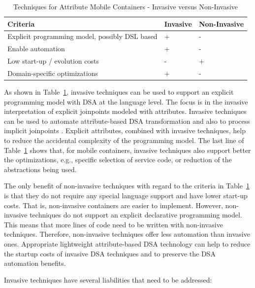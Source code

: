 \begin{table}[ht]
	\begin{center}
		\begin{tabular}[t]{|l||l|l|}
\rowcolor[gray]{.7}
\hline
Criteria & Invasive & Non-Invasive \\
\hline
Explicit programming model, possibly DSL based & + & - \\
Enable automation & + & - \\
Low start-up / evolution costs & - & + \\
Domain-specific optimizations & + & - \\
\hline
		\end{tabular}
	\end{center}

	\caption{Techniques for Attribute Mobile Containers - Invasive versus Non-Invasive}
	\label{tab:InvasiveVSNonInvasive}
\end{table}

As shown in Table~\ref{tab:InvasiveVSNonInvasive}, invasive techniques can be used to support an explicit programming model with DSA at the language level. The focus is in the invasive interpretation of explicit joinpoints modeled with attributes. Invasive techniques can be used to automate attribute-based DSA transformation and also to process implicit joinpoints . Explicit attributes, combined with invasive techniques, help to reduce the accidental complexity of the programming model. The last line of Table~\ref{tab:InvasiveVSNonInvasive} shows that, for mobile containers, invasive techniques also support better the optimizations, e.g., specific selection of service code, or reduction of the abstractions being used.

The only benefit of non-invasive techniques with regard to the criteria in Table~\ref{tab:InvasiveVSNonInvasive} is that they do not require any special language support and have lower start-up costs. That is, non-invasive containers are easier to implement.
However, non-invasive techniques do not support an explicit declarative programming model. This means that more lines of code need to be written with non-invasive techniques. Therefore, non-invasive techniques offer less automation than invasive ones. Appropriate lightweight attribute-based DSA technology can help to reduce the startup costs of invasive DSA techniques and to preserve the DSA automation benefits.

Invasive techniques have several liabilities that need to be addressed:


